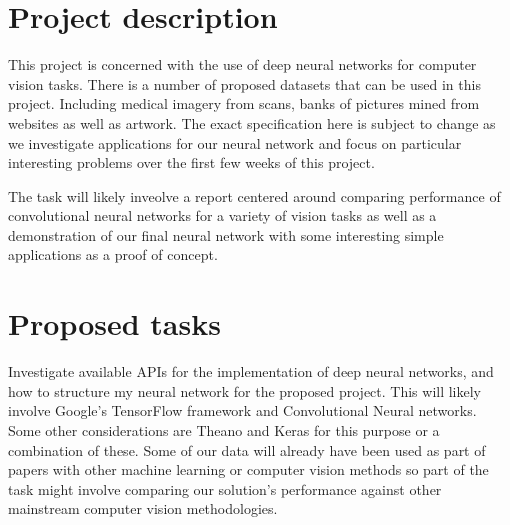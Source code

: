 \documentclass[11pt,fleqn,twoside]{article}
\begin{document}
\wordcount{}

\mmp

\setcounter{tocdepth}{3} %


\section{Project description}
This project is concerned with the use of deep neural networks for computer vision tasks. There is a number of proposed datasets that can be used in this project. Including medical imagery from scans, banks of pictures mined from websites as well as artwork. The exact specification here is subject to change as we investigate applications for our neural network and focus on particular interesting problems over the first few weeks of this project.

The task will likely inveolve a report centered around comparing performance of convolutional neural networks for a variety of vision tasks as well as a demonstration of our final neural network with some interesting simple applications as a proof of concept. 

\section{Proposed tasks}
Investigate available APIs for the implementation of deep neural networks, and how to structure my neural network for the proposed project.
This will likely involve Google's TensorFlow framework and Convolutional Neural networks. Some other considerations are Theano and Keras for this purpose or a combination of these.
Some of our data will already have been used as part of papers with other machine learning or computer vision methods so part of the task might involve comparing our solution's performance against other mainstream computer vision methodologies.
\end{document}
